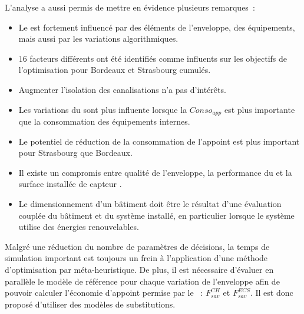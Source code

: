 L’analyse a aussi permis de mettre en évidence plusieurs remarques~:
\begin{itemize}
  \item Le  est fortement influencé par des éléments de l’enveloppe, des équipements,
        mais aussi par les variations algorithmiques.
  \item $16$ facteurs différents ont été identifiés comme influents sur les objectifs de
        l’optimisation pour Bordeaux et Strasbourg cumulés.
  \item Augmenter l’isolation des canalisations n’a pas d’intérêts.
  \item Les variations du  sont plus influente lorsque la $Conso_{app}$
        est plus importante que la consommation des équipements internes.
  \item Le potentiel de réduction de la consommation de l’appoint est plus important
        pour Strasbourg que Bordeaux.
  \item Il existe un compromis entre qualité de l’enveloppe, la performance du 
        et la surface installée de capteur .
  \item Le dimensionnement d’un bâtiment doit être le résultat d’une évaluation
        couplée du bâtiment et du système installé, en particulier lorsque le système
        utilise des énergies renouvelables.
\end{itemize}

Malgré une réduction du nombre de paramètres de décisions, la temps de simulation
important est toujours un frein à l’application d’une méthode d’optimisation
par méta-heuristique. De plus, il est nécessaire d’évaluer en parallèle le modèle
de référence pour chaque variation de l’enveloppe afin de pouvoir calculer l’économie
d’appoint permise par le ~: $F_{sav}^{CH}$ et $F_{sav}^{ECS}$. Il est donc
proposé d’utiliser des modèles de substitutions.


